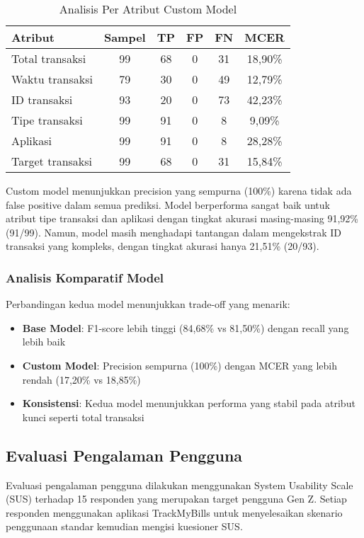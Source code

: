 \begin{table}[htbp]
\centering
\caption{Analisis Per Atribut Custom Model}
\label{tab:custom-model-detail}
\begin{tabular}{|l|c|c|c|c|c|}
\hline
\textbf{Atribut} & \textbf{Sampel} & \textbf{TP} & \textbf{FP} & \textbf{FN} & \textbf{MCER} \\
\hline
Total transaksi & 99 & 68 & 0 & 31 & 18,90\% \\
\hline
Waktu transaksi & 79 & 30 & 0 & 49 & 12,79\% \\
\hline
ID transaksi & 93 & 20 & 0 & 73 & 42,23\% \\
\hline
Tipe transaksi & 99 & 91 & 0 & 8 & 9,09\% \\
\hline
Aplikasi & 99 & 91 & 0 & 8 & 28,28\% \\
\hline
Target transaksi & 99 & 68 & 0 & 31 & 15,84\% \\
\hline
\end{tabular}
\end{table}

Custom model menunjukkan precision yang sempurna (100\%) karena tidak ada false positive dalam semua prediksi. Model berperforma sangat baik untuk atribut tipe transaksi dan aplikasi dengan tingkat akurasi masing-masing 91,92\% (91/99). Namun, model masih menghadapi tantangan dalam mengekstrak ID transaksi yang kompleks, dengan tingkat akurasi hanya 21,51\% (20/93).

\subsubsection{Analisis Komparatif Model}
Perbandingan kedua model menunjukkan trade-off yang menarik:
\begin{itemize}
    \item \textbf{Base Model}: F1-score lebih tinggi (84,68\% vs 81,50\%) dengan recall yang lebih baik
    \item \textbf{Custom Model}: Precision sempurna (100\%) dengan MCER yang lebih rendah (17,20\% vs 18,85\%)
    \item \textbf{Konsistensi}: Kedua model menunjukkan performa yang stabil pada atribut kunci seperti total transaksi
\end{itemize}

\subsection{Evaluasi Pengalaman Pengguna}
Evaluasi pengalaman pengguna dilakukan menggunakan System Usability Scale (SUS) terhadap 15 responden yang merupakan target pengguna Gen Z. Setiap responden menggunakan aplikasi TrackMyBills untuk menyelesaikan skenario penggunaan standar kemudian mengisi kuesioner SUS.

